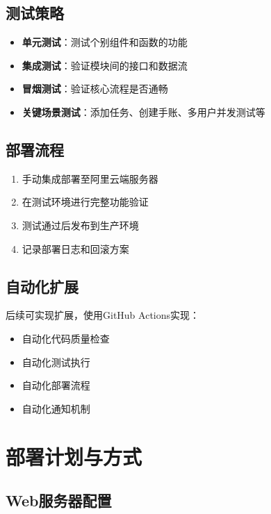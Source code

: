 \documentclass[a4paper]{article}
\begin{document}
\subsection{测试策略}

\begin{itemize}
    \item \textbf{单元测试}：测试个别组件和函数的功能
    \item \textbf{集成测试}：验证模块间的接口和数据流
    \item \textbf{冒烟测试}：验证核心流程是否通畅
    \item \textbf{关键场景测试}：添加任务、创建手账、多用户并发测试等
\end{itemize}

\subsection{部署流程}

\begin{enumerate}
    \item 手动集成部署至阿里云端服务器
    \item 在测试环境进行完整功能验证
    \item 测试通过后发布到生产环境
    \item 记录部署日志和回滚方案
\end{enumerate}

\subsection{自动化扩展}

后续可实现扩展，使用GitHub Actions实现：

\begin{itemize}
    \item 自动化代码质量检查
    \item 自动化测试执行
    \item 自动化部署流程
    \item 自动化通知机制
\end{itemize}

\section{部署计划与方式}

\subsection{Web服务器配置}
\end{document}
